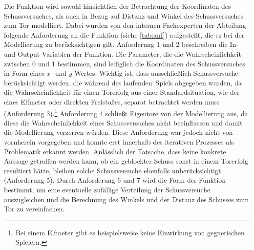 Die Funktion wird sowohl hinsichtlich der Betrachtung der Koordinaten des Schussversuches, als auch in Bezug auf Distanz und Winkel des Schussversuches zum Tor modelliert. Dabei wurden von den internen Fachexperten der Abteilung folgende Anforderung an die Funktion (siehe \vref{tab:anf}) aufgestellt, die es bei der Modellierung zu berücksichtigen gilt. Anforderung \textsf{1} und \textsf{2} beschreiben die In- und Output-Variablen der Funktion. Die Parameter, die die Wahrscheinlichkeit zwischen 0 und 1 bestimmen, sind lediglich die Koordinaten des Schussversuches in Form eines $x$- und $y$-Wertes. Wichtig ist, dass ausschließlich Schussversuche berücksichtigt werden, die während des \glqq laufenden\grqq~Spiels abgegeben wurden, da die Wahrscheinlichkeit für einen Torerfolg aus einer Standardsituation, wie der eines Elfmeter oder direkten Freistoßes, separat betrachtet werden muss (Anforderung \textsf{3}).\footnote{Bei einem Elfmeter gibt es beispielsweise keine Einwirkung von gegnerischen Spielern.} Anforderung \textsf{4} schließt Eigentore von der Modellierung aus, da diese die Wahrscheinlichkeit eines Schussversuches nicht beeinflussen und damit die Modellierung verzerren würden. Diese Anforderung war jedoch nicht von vornherein vorgegeben und konnte erst innerhalb des iterativen Prozesses als Problematik erkannt werden. Anlässlich der Tatsache, dass keine konkrete Aussage getroffen werden kann, ob ein geblockter Schuss sonst in einem Torerfolg resultiert hätte, bleiben solche Schussversuche ebenfalls unberücksichtigt (Anforderung \textsf{5}). Durch Anforderung \textsf{6} und \textsf{7} wird die Form der Funktion bestimmt, um eine eventuelle zufällige Verteilung der Schussversuche auszugleichen und die Berechnung des Winkels und der Distanz des Schusses zum Tor zu vereinfachen.

